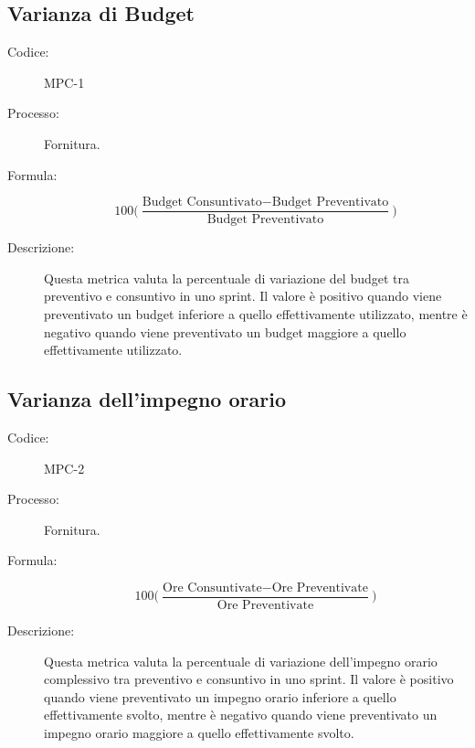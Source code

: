 \subsection{Varianza di Budget}
\begin{description}
    \item[Codice:] MPC-1
    \item[Processo:] Fornitura.
    \item[Formula:] 
    \begin{equation}
        100\biggl(\frac{\text{Budget Consuntivato} - \text{Budget Preventivato}}{\text{Budget Preventivato}}\biggr)
    \end{equation}
    \item[Descrizione:] Questa metrica valuta la percentuale di variazione del budget tra preventivo e consuntivo in uno sprint. Il valore è positivo quando viene preventivato un budget inferiore a quello effettivamente utilizzato, mentre è negativo quando viene preventivato un budget maggiore a quello effettivamente utilizzato.
\end{description}

\subsection{Varianza dell’impegno orario}
\begin{description}
    \item[Codice:] MPC-2
    \item[Processo:] Fornitura.
    \item[Formula:]
    \begin{equation}
        100\biggl(\frac{\text{Ore Consuntivate} - \text{Ore Preventivate}}{\text{Ore Preventivate}}\biggr)
    \end{equation}
    \item[Descrizione:] Questa metrica valuta la percentuale di variazione dell'impegno orario complessivo tra preventivo e consuntivo in uno sprint. Il valore è positivo quando viene preventivato un impegno orario inferiore a quello effettivamente svolto, mentre è negativo quando viene preventivato un impegno orario maggiore a quello effettivamente svolto.
\end{description}

